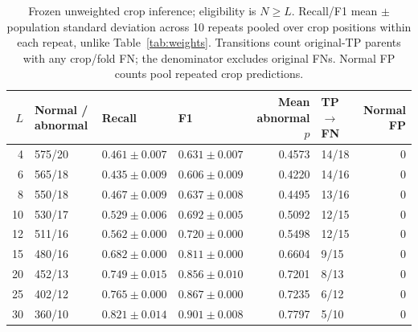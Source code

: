 \begin{table}[t]
\centering
\caption{Frozen unweighted crop inference; eligibility is $N\geq L$. Recall/F1 mean $\pm$ population standard deviation across 10 repeats pooled over crop positions within each repeat, unlike Table~\ref{tab:weights}. Transitions count original-TP parents with any crop/fold FN; the denominator excludes original FNs. Normal FP counts pool repeated crop predictions.}
\label{tab:length}
\small
\begin{tabular}{rlllrlr}
\toprule
$L$ & Normal / abnormal & Recall & F1 & Mean abnormal $p$ & TP $\rightarrow$ FN & Normal FP \\
\midrule
4 & 575/20 & $0.461\pm0.007$ & $0.631\pm0.007$ & 0.4573 & 14/18 & 0 \\
6 & 565/18 & $0.435\pm0.009$ & $0.606\pm0.009$ & 0.4220 & 14/16 & 0 \\
8 & 550/18 & $0.467\pm0.009$ & $0.637\pm0.008$ & 0.4495 & 13/16 & 0 \\
10 & 530/17 & $0.529\pm0.006$ & $0.692\pm0.005$ & 0.5092 & 12/15 & 0 \\
12 & 511/16 & $0.562\pm0.000$ & $0.720\pm0.000$ & 0.5498 & 12/15 & 0 \\
15 & 480/16 & $0.682\pm0.000$ & $0.811\pm0.000$ & 0.6604 & 9/15 & 0 \\
20 & 452/13 & $0.749\pm0.015$ & $0.856\pm0.010$ & 0.7201 & 8/13 & 0 \\
25 & 402/12 & $0.765\pm0.000$ & $0.867\pm0.000$ & 0.7235 & 6/12 & 0 \\
30 & 360/10 & $0.821\pm0.014$ & $0.901\pm0.008$ & 0.7797 & 5/10 & 0 \\
\bottomrule
\end{tabular}
\end{table}
